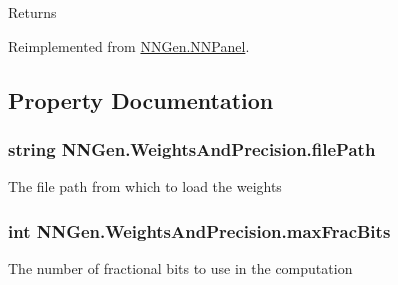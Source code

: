 \begin{DoxyReturn}{Returns}

\end{DoxyReturn}


Reimplemented from \hyperlink{class_n_n_gen_1_1_n_n_panel_a36e3bcf90c9e561e8502eac6f884582a}{N\+N\+Gen.\+N\+N\+Panel}.



\subsection{Property Documentation}
\hypertarget{class_n_n_gen_1_1_weights_and_precision_adadd8787371829217f9e9f11fe4f6043}{}
\subsubsection[{file\+Path}]{\setlength{\rightskip}{0pt plus 5cm}string N\+N\+Gen.\+Weights\+And\+Precision.\+file\+Path\hspace{0.3cm}{\ttfamily [get]}}\label{class_n_n_gen_1_1_weights_and_precision_adadd8787371829217f9e9f11fe4f6043}


The file path from which to load the weights 

\hypertarget{class_n_n_gen_1_1_weights_and_precision_a3ee82e53091eb1795bd64cb9b252b952}{}
\subsubsection[{max\+Frac\+Bits}]{\setlength{\rightskip}{0pt plus 5cm}int N\+N\+Gen.\+Weights\+And\+Precision.\+max\+Frac\+Bits\hspace{0.3cm}{\ttfamily [get]}}\label{class_n_n_gen_1_1_weights_and_precision_a3ee82e53091eb1795bd64cb9b252b952}


The number of fractional bits to use in the computation 

\hypertarget{class_n_n_gen_1_1_weights_and_precision_a677dd8c72d4d4a7a2b18b292b1a9f6ee}{}
